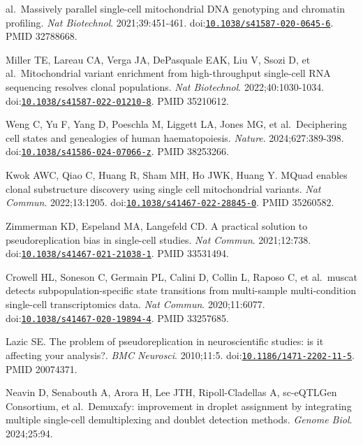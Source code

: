 \documentclass[11pt]{article}
\begin{document}
\begin{enumerate}[label={[\arabic*]},leftmargin=2.6em,labelsep=0.5em,itemsep=1.5pt]
  al.~Massively parallel single-cell mitochondrial DNA genotyping and
  chromatin profiling. \emph{Nat Biotechnol}. 2021;39:451-461.
  doi:\href{https://doi.org/10.1038/s41587-020-0645-6}{\nolinkurl{10.1038/s41587-020-0645-6}}.
  PMID 32788668.
\item
  Miller TE, Lareau CA, Verga JA, DePasquale EAK, Liu V, Ssozi D, et
  al.~Mitochondrial variant enrichment from high-throughput single-cell
  RNA sequencing resolves clonal populations. \emph{Nat Biotechnol}.
  2022;40:1030-1034.
  doi:\href{https://doi.org/10.1038/s41587-022-01210-8}{\nolinkurl{10.1038/s41587-022-01210-8}}.
  PMID 35210612.
\item
  Weng C, Yu F, Yang D, Poeschla M, Liggett LA, Jones MG, et
  al.~Deciphering cell states and genealogies of human haematopoiesis.
  \emph{Nature}. 2024;627:389-398.
  doi:\href{https://doi.org/10.1038/s41586-024-07066-z}{\nolinkurl{10.1038/s41586-024-07066-z}}.
  PMID 38253266.
\item
  Kwok AWC, Qiao C, Huang R, Sham MH, Ho JWK, Huang Y. MQuad enables
  clonal substructure discovery using single cell mitochondrial
  variants. \emph{Nat Commun}. 2022;13:1205.
  doi:\href{https://doi.org/10.1038/s41467-022-28845-0}{\nolinkurl{10.1038/s41467-022-28845-0}}.
  PMID 35260582.
\item
  Zimmerman KD, Espeland MA, Langefeld CD. A practical solution to
  pseudoreplication bias in single-cell studies. \emph{Nat Commun}.
  2021;12:738.
  doi:\href{https://doi.org/10.1038/s41467-021-21038-1}{\nolinkurl{10.1038/s41467-021-21038-1}}.
  PMID 33531494.
\item
  Crowell HL, Soneson C, Germain PL, Calini D, Collin L, Raposo C, et
  al.~muscat detects subpopulation-specific state transitions from
  multi-sample multi-condition single-cell transcriptomics data.
  \emph{Nat Commun}. 2020;11:6077.
  doi:\href{https://doi.org/10.1038/s41467-020-19894-4}{\nolinkurl{10.1038/s41467-020-19894-4}}.
  PMID 33257685.
\item
  Lazic SE. The problem of pseudoreplication in neuroscientific studies:
  is it affecting your analysis?. \emph{BMC Neurosci}. 2010;11:5.
  doi:\href{https://doi.org/10.1186/1471-2202-11-5}{\nolinkurl{10.1186/1471-2202-11-5}}.
  PMID 20074371.
\item
  Neavin D, Senabouth A, Arora H, Lee JTH, Ripoll-Cladellas A,
  sc-eQTLGen Consortium, et al.~Demuxafy: improvement in droplet
  assignment by integrating multiple single-cell demultiplexing and
  doublet detection methods. \emph{Genome Biol}. 2024;25:94.

\end{enumerate}
\end{document}
